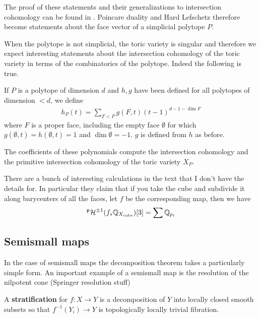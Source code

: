 \documentclass[12pt]{article}
\begin{document}
The proof of these statements and their generalizations 
to intersection cohomology can be found in \cite{goresky}.
Poincare duality and Hard Lefschetz therefore become statements about 
the face vector of a simplicial polytope $P$.

\hfill

When the polytope is not simplicial, the toric variety is singular and therefore 
we expect interesting statements about the intersection cohomology of the toric variety
in terms of the combinatorics of the polytope. Indeed the following is true.

\begin{definition}
    If $P$ is a polytope of dimension $d$ and $h,g$ have been defined for all 
    polytopes of dimension $<d$, we define \begin{align*}
        h_P(t) = \sum_{F<P}g(F,t)(t-1)^{d-1-\dim F}
    \end{align*} where $F$ is a proper face, including the empty face $\emptyset$ for 
    which $g(\emptyset,t) = h(\emptyset,t) = 1$ and $\dim \emptyset = -1$. $g$
    is defined from $h$ as before.
\end{definition}

\begin{proposition}
    The coefficients of these polynomials compute
    the intersection cohomology and the primitive 
    intersection cohomology of the toric variety $X_P$.
\end{proposition}

\begin{remark}
    There are a bunch of interesting calculations in the text that
    I don't have the details for. In particular they claim that if you take
    the cube and subdivide it along barycenters of all the faces, let $f$
    be the corresponding map, then we have \begin{align*}
        ^{\mathfrak{p}}{\mathcal{H}}^{\pm 1}(f_*\mathbb{Q}_{X_\text{cube}})[3] = \sum \mathbb{Q}_{p_i}
    \end{align*}
\end{remark}

\subsection{Semismall maps}
In the case of semismall maps the decomposition theorem takes a 
particularly simple form. An important example of a semismall map is the resolution of the 
nilpotent cone (Springer resolution stuff)

\begin{definition}
    A \textbf{stratification} for $f:X\to Y$ is a 
    decomposition of $Y$ into locally closed smooth subsets 
    so that $f^{-1}(Y_i) \to Y$ is topologically locally trivial fibration. 
\end{definition}
\end{document}
